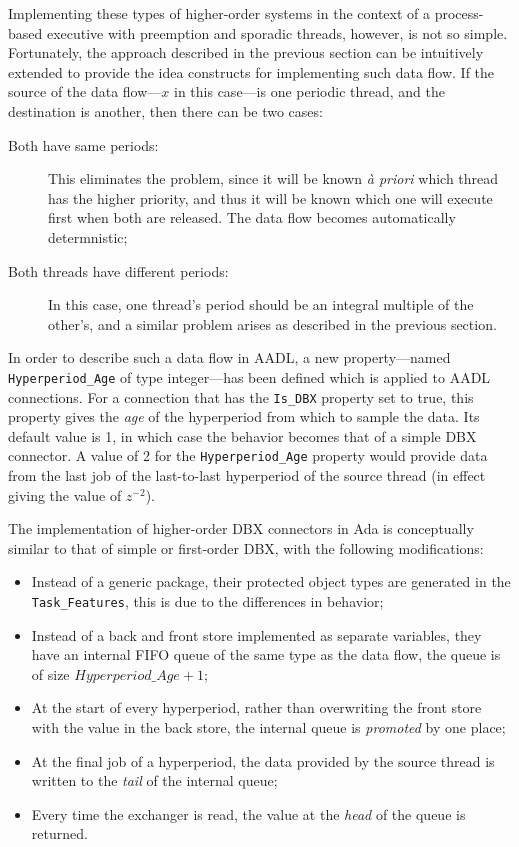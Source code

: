 Implementing these types of higher-order systems in the context of a
process-based executive with preemption and sporadic threads, however,
is not so simple. Fortunately, the approach described in the previous
section can be intuitively extended to provide the idea constructs for
implementing such data flow. If the source of the data flow---$x$ in
this case---is one periodic thread, and the destination is another,
then there can be two cases:

\begin{description}
\item[Both have same periods:]{This eliminates the problem, since it
  will be known \emph{\`a priori} which thread has the higher
  priority, and thus it will be known which one will execute first
  when both are released. The data flow becomes automatically
  determnistic;}
\item[Both threads have different periods:]{In this case, one thread's
  period should be an integral multiple of the other's, and a similar
  problem arises as described in the previous section.}
\end{description}

In order to describe such a data flow in AADL, a new property---named
\texttt{Hyperperiod\_Age} of type integer---has been defined which is
applied to AADL connections. For a connection that has the
\texttt{Is\_DBX} property set to true, this property gives the
\emph{age} of the hyperperiod from which to sample the data. Its
default value is 1, in which case the behavior becomes that of a
simple DBX connector. A value of 2 for the \texttt{Hyperperiod\_Age}
property would provide data from the last job of the last-to-last
hyperperiod of the source thread (in effect giving the value of
$z^{-2}$).

The implementation of higher-order DBX connectors in Ada is
conceptually similar to that of simple or first-order DBX, with the
following modifications:

\begin{itemize}
\item{Instead of a generic package, their protected object types are
  generated in the \texttt{Task\_Features}, this is due to the
  differences in behavior;}
\item{Instead of a back and front store implemented as separate
  variables, they have an internal FIFO queue of the same type as the
  data flow, the queue is of size $Hyperperiod\_Age+1$;}
\item{At the start of every hyperperiod, rather than overwriting the
  front store with the value in the back store, the internal queue is
  \emph{promoted} by one place;}
\item{At the final job of a hyperperiod, the data provided by the
  source thread is written to the \emph{tail} of the internal queue;}
\item{Every time the exchanger is read, the value at the \emph{head}
  of the queue is returned.}
\end{itemize}

